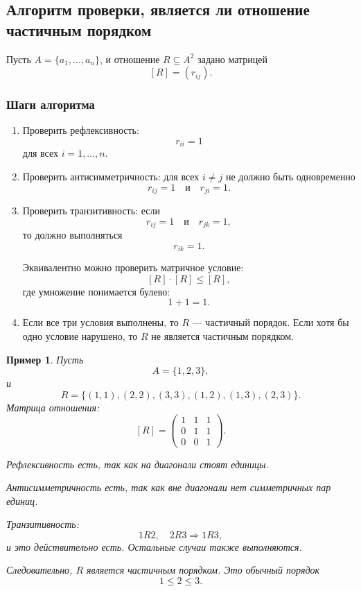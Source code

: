 \documentclass[12pt,a4paper]{article}
\newtheorem{example}{Пример}
\begin{document}
\subsection{Алгоритм проверки, является ли отношение частичным порядком}

Пусть $A=\{a_1,\dots,a_n\}$, и отношение $R\subseteq A^2$ задано матрицей
\[
[R]=(r_{ij}).
\]

\subsubsection*{Шаги алгоритма}

\begin{enumerate}
\item Проверить рефлексивность:
\[
r_{ii}=1
\]
для всех $i=1,\dots,n$.

\item Проверить антисимметричность:
для всех $i\ne j$ не должно быть одновременно
\[
r_{ij}=1
\quad\text{и}\quad
r_{ji}=1.
\]

\item Проверить транзитивность:
если
\[
r_{ij}=1
\quad\text{и}\quad
r_{jk}=1,
\]
то должно выполняться
\[
r_{ik}=1.
\]

Эквивалентно можно проверить матричное условие:
\[
[R]\cdot [R]\leq [R],
\]
где умножение понимается булево:
\[
1+1=1.
\]

\item Если все три условия выполнены, то $R$ --- частичный порядок.
Если хотя бы одно условие нарушено, то $R$ не является частичным порядком.
\end{enumerate}

\begin{example}
Пусть
\[
A=\{1,2,3\},
\]
и
\[
R=\{(1,1),(2,2),(3,3),(1,2),(1,3),(2,3)\}.
\]
Матрица отношения:
\[
[R]=
\begin{pmatrix}
1&1&1\\
0&1&1\\
0&0&1
\end{pmatrix}.
\]

Рефлексивность есть, так как на диагонали стоят единицы.

Антисимметричность есть, так как вне диагонали нет симметричных пар единиц.

Транзитивность:
\[
1R2,\quad 2R3 \Rightarrow 1R3,
\]
и это действительно есть.
Остальные случаи также выполняются.

Следовательно, $R$ является частичным порядком.
Это обычный порядок
\[
1\leq 2\leq 3.
\]
\end{example}
\end{document}
